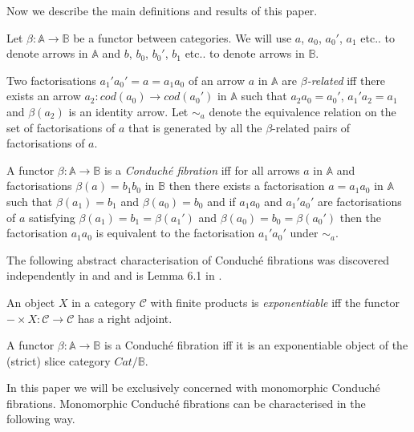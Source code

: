 \documentclass{article}
\begin{document}
Now we describe the main definitions and results of this paper.

\begin{notation}
	Let $\beta:\mathbb{A}\rightarrow\mathbb{B}$ be a functor between categories.
	We will use $a$, $a_0$, $a_0'$, $a_1$ etc.. to denote arrows in $\mathbb{A}$ and $b$, $b_0$, $b_0'$, $b_1$ etc.. to denote arrows in $\mathbb{B}$.
\end{notation}

\begin{definition}
	Two factorisations $a_1'a_0'=a=a_1a_0$ of an arrow $a$ in $\mathbb{A}$ are \emph{$\beta$-related} iff there exists an arrow $a_2:cod(a_0)\rightarrow cod(a_0')$ in $\mathbb{A}$ such that $a_2a_0=a_0'$, $a_1'a_2=a_1$ and $\beta(a_2)$ is an identity arrow.
	Let $\sim_{a}$ denote the equivalence relation on the set of factorisations of $a$ that is generated by all the $\beta$-related pairs of factorisations of $a$.
\end{definition}

\begin{definition}
	A functor $\beta: \mathbb{A} \rightarrow \mathbb{B}$ is a \emph{Conduch\'{e} fibration} iff for all arrows $a$ in $\mathbb{A}$ and factorisations $\beta(a)=b_1b_0$ in $\mathbb{B}$ then there exists a factorisation $a=a_1a_0$ in $\mathbb{A}$ such that $\beta(a_1)=b_1$ and $\beta(a_0)=b_0$ and if $a_1a_0$ and $a_1'a_0'$ are factorisations of $a$ satisfying $\beta(a_1)=b_1=\beta(a_1')$ and $\beta(a_0)=b_0=\beta(a_0')$ then the factorisation $a_1a_0$ is equivalent to the factorisation $a_1'a_0'$ under $\sim_a$.
\end{definition}

The following abstract characterisation of Conduch\'{e} fibrations was discovered independently in \cite{MR0190142} and \cite{MR0310033} and is Lemma 6.1 in \cite{MR1245798}.

\begin{definition}
	An object $X$ in a category $\mathcal C$ with finite products is \emph{exponentiable} iff the functor $-\times X:\mathcal C \rightarrow \mathcal C$ has a right adjoint.
\end{definition}

\begin{lemma}
	A functor $\beta:\mathbb{A}\rightarrow \mathbb{B}$ is a Conduch\'{e} fibration iff it is an exponentiable object of the (strict) slice category $Cat/\mathbb{B}$.
\end{lemma}

In this paper we will be exclusively concerned with monomorphic Conduch\'{e} fibrations.
Monomorphic Conduch\'{e} fibrations can be characterised in the following way.
\end{document}
